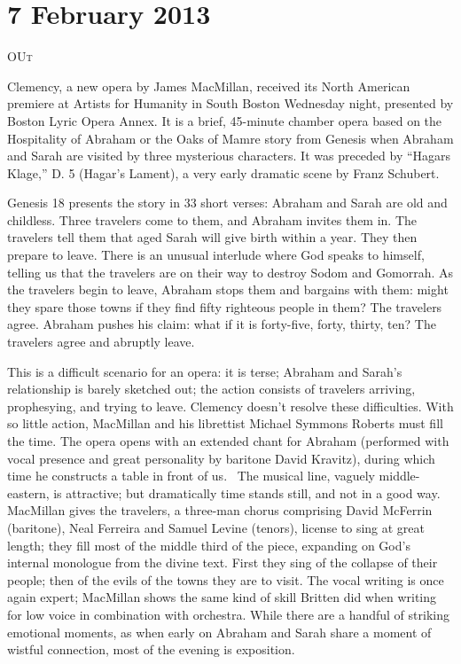 \chapter{7 February 2013}

\textsc{OUt}

Clemency, a new opera by James MacMillan, received its North American premiere at Artists for Humanity in South Boston Wednesday night, presented by Boston Lyric Opera Annex. It is a brief, 45-minute chamber opera based on the Hospitality of Abraham or the Oaks of Mamre story from Genesis when Abraham and Sarah are visited by three mysterious characters. It was preceded by “Hagars Klage,” D. 5 (Hagar’s Lament), a very early dramatic scene by Franz Schubert.

Genesis 18 presents the story in 33 short verses: Abraham and Sarah are old and childless. Three travelers come to them, and Abraham invites them in. The travelers tell them that aged Sarah will give birth within a year. They then prepare to leave. There is an unusual interlude where God speaks to himself, telling us that the travelers are on their way to destroy Sodom and Gomorrah. As the travelers begin to leave, Abraham stops them and bargains with them: might they spare those towns if they find fifty righteous people in them? The travelers agree. Abraham pushes his claim: what if it is forty-five, forty, thirty, ten? The travelers agree and abruptly leave.

This is a difficult scenario for an opera: it is terse; Abraham and Sarah’s relationship is barely sketched out; the action consists of travelers arriving, prophesying, and trying to leave. Clemency doesn’t resolve these difficulties. With so little action, MacMillan and his librettist Michael Symmons Roberts must fill the time. The opera opens with an extended chant for Abraham (performed with vocal presence and great personality by baritone David Kravitz), during which time he constructs a table in front of us.  The musical line, vaguely middle-eastern, is attractive; but dramatically time stands still, and not in a good way.  MacMillan gives the travelers, a three-man chorus comprising David McFerrin (baritone), Neal Ferreira and Samuel Levine (tenors), license to sing at great length; they fill most of the middle third of the piece, expanding on God’s internal monologue from the divine text. First they sing of the collapse of their people; then of the evils of the towns they are to visit. The vocal writing is once again expert; MacMillan shows the same kind of skill Britten did when writing for low voice in combination with orchestra. While there are a handful of striking emotional moments, as when early on Abraham and Sarah share a moment of wistful connection, most of the evening is exposition.

